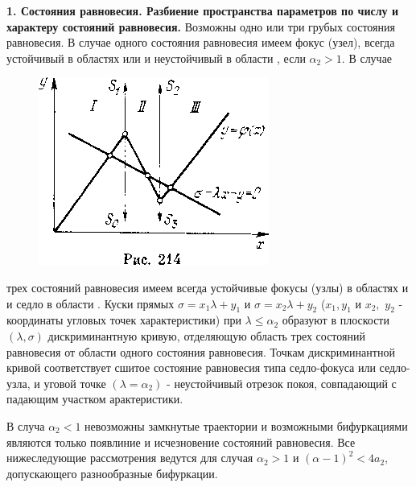 \documentclass{article}
\newcommand{\RomanNumeralCaps}[1]
    {\MakeUppercase{\romannumeral #1}}
\begin{document}
\textbf{1. Состояния равновесия. Разбиение пространства параметров
по числу и характеру состояний равновесия.} Возможны одно
или три грубых состояния равновесия. В случае одного состояния
равновесия имеем фокус (узел), всегда устойчивый в областях
\RomanNumeralCaps{1} или \RomanNumeralCaps{3} и неустойчивый в области \RomanNumeralCaps{2}, если $\alpha_{2}>1$. В случае
\begin{figure}

\raggedleft

\includegraphics[width=1\linewidth]{../img/img214.png}


\label{fig:mpr}

\end{figure}
трех состояний равновесия имеем
всегда устойчивые фокусы (узлы)
в областях \RomanNumeralCaps{1} и \RomanNumeralCaps{3} и седло в области
\RomanNumeralCaps{2}. Куски прямых $\sigma = x_{1} \lambda +y_{1}$
и $\sigma = x_{2} \lambda +y_{2}$ ($x_{1}, y_{1}$ и $x_{2},$
$y_{2}$ - координаты угловых точек
характеристики) при $\lambda \leq \alpha_{2} $ образуют
в плоскости $(\lambda, \sigma)$ дискриминантную 
кривую, отделяющую область
трех состояний равновесия
от области одного состояния равновесия. Точкам дискриминантной
кривой соответствует сшитое состояние
равновесия типа седло-фокуса или седло-узла, и уговой 
точке $(\lambda = \alpha_{2})$ - неустойчивый отрезок покоя, совпадающий с падающим
участком арактеристики.

В случа $\alpha_{2}<1$ невозможны замкнутые траектории и возможными
бифуркациями являются только появлиние и исчезновение
состояний равновесия. Все нижеследующие рассмотрения ведутся
для случая $\alpha_{2}>1$ и $(\alpha - 1)^2<4a_{2}$, допускающего разнообразные
бифуркации.
\end{document}
